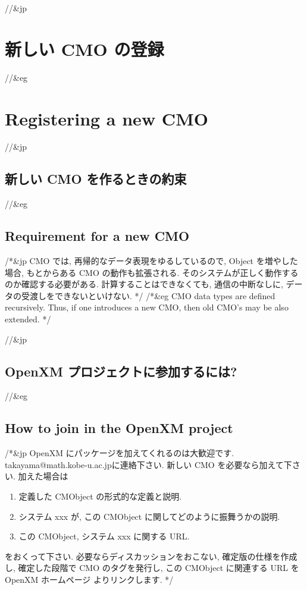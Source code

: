 //&jp \section{ 新しい CMO の登録 }
//&eg \section{ Registering a new CMO }

//&jp \subsection{新しい CMO を作るときの約束}
//&eg \subsection{Requirement for a new CMO}

/*&jp
CMO では, 再帰的なデータ表現をゆるしているので,
Object を増やした場合, もとからある CMO の動作も拡張される.
そのシステムが正しく動作するのか確認する必要がある.
計算することはできなくても, 通信の中断なしに,
データの受渡しをできないといけない.
*/
/*&eg
CMO data types are defined recursively.
Thus, if one introduces a new CMO, then old CMO's may be 
also extended.
*/

//&jp \subsection{OpenXM プロジェクトに参加するには?}
//&eg \subsection{How to join in the OpenXM project}

/*&jp
OpenXM にパッケージを加えてくれるのは大歓迎です.
takayama@math.kobe-u.ac.jpに連絡下さい.
新しい CMO を必要なら加えて下さい.
加えた場合は
\begin{enumerate}
\item 定義した CMObject の形式的な定義と説明.
\item システム xxx が, この CMObject に関してどのように振舞うかの説明.
\item この CMObject, システム xxx に関する URL.
\end{enumerate}
をおくって下さい.
必要ならディスカッションをおこない, 確定版の仕様を作成し, 確定した段階で
CMO のタグを発行し, この CMObject に関連する URL を
OpenXM ホームページ \cite{openxxx} よりリンクします.
*/

